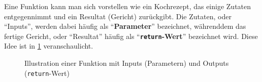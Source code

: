 Eine Funktion kann man sich vorstellen wie ein Kochrezept, das einige Zutaten entgegennimmt und ein Resultat (Gericht) zurückgibt. Die Zutaten, oder \enquote{Inputs}, werden dabei häufig als \enquote{\textbf{Parameter}} bezeichnet, währenddem das fertige Gericht, oder \enquote{Resultat} häufig als \enquote{\textbf{\lstinline|return|-Wert}} bezeichnet wird. Diese Idee ist in \cref{fig:funktion-einzeln} veranschaulicht.

\begin{figure}[H]
	\centering
	\caption{Illustration einer Funktion mit Inputs (Parametern) und Outputs (\lstinline|return|-Wert)}
	\label{fig:funktion-einzeln}
\end{figure}


